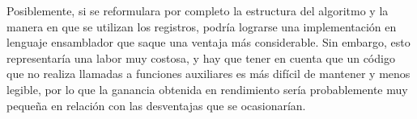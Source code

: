            Posiblemente, si se reformulara por completo la estructura del algoritmo y la manera en que se utilizan los registros, podría lograrse una implementación en lenguaje ensamblador que saque una ventaja más considerable. Sin embargo, esto representaría una labor muy costosa, y hay que tener en cuenta que un código que no realiza llamadas a funciones auxiliares es más difícil de mantener y menos legible, por lo que la ganancia obtenida en rendimiento sería probablemente muy pequeña en relación con las desventajas que se ocasionarían.